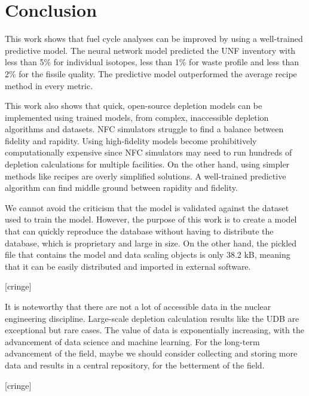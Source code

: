 \section{Conclusion}
This work shows that fuel cycle analyses can be improved
by using a well-trained predictive model. The neural
network model predicted the \gls{UNF} inventory
with less than 5\% for individual isotopes,
less than 1\% for waste profile 
and less than 2\% for the fissile quality.
The predictive model outperformed the average recipe
method in every metric.

This work also shows that quick, open-source depletion models
can be implemented using trained models, from
complex, inaccessible depletion algorithms and
datasets. \gls{NFC} simulators struggle to find a balance
between fidelity and rapidity. Using high-fidelity
models become prohibitively computationally expensive
since \gls{NFC} simulators may need to run
hundreds of depletion calculations for multiple
facilities. On the other hand, using simpler methods
like recipes are overly simplified solutions.
A well-trained predictive algorithm can find middle
ground between rapidity and fidelity.

We cannot avoid the criticism that the model is validated
against the dataset used to train the model. However, the purpose
of this work is to create a model that can quickly reproduce the
database without having to distribute the database, which is proprietary
and large in size. On the other hand, the pickled file that contains
the model and data scaling objects is only 38.2 kB, meaning that it
can be easily distributed and imported in external software.

[cringe]

It is noteworthy that there are not a lot of accessible data in the
nuclear engineering discipline. Large-scale depletion
calculation results like the \gls{UDB} are exceptional
but rare cases. The value of data is exponentially increasing,
with the advancement of data science and machine learning.
For the long-term advancement of the field, maybe we should
consider collecting and storing more data and results in
a central repository, for the betterment of the field.

[cringe]
